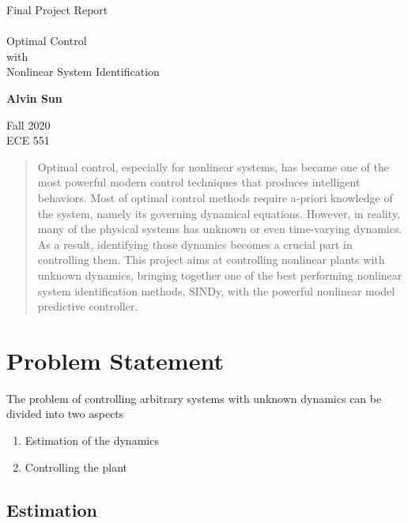 \documentclass[10pt,twocolumn]{article}
\begin{document}
\begin{titlepage}
  \begin{center}
    \Huge
    Final Project Report \\
    \hfill \\
    Optimal Control \\ with \\ Nonlinear System Identification

    \vfill

    \Large
    \textbf{Alvin Sun} \\

    \vfill

    Fall 2020 \\
    ECE 551

  \end{center}
\end{titlepage}

\begin{abstract}
  Optimal control, especially for nonlinear systems, has became one of the most powerful
  modern control techniques that produces intelligent behaviors. Most of optimal control
  methods require a-priori knowledge of the system, namely its governing dynamical equations.
  However, in reality, many of the physical systems has unknown or even time-varying dynamics.
  As a result, identifying those dynamics becomes a crucial part in controlling them.
  This project aims at controlling nonlinear plants with unknown dynamics, bringing together
  one of the best performing nonlinear system identification methods, SINDy, with the
  powerful nonlinear model predictive controller.
\end{abstract}

\section{Problem Statement}

The problem of controlling arbitrary systems with unknown dynamics can be divided into
two aspects
\begin{enumerate}
  \item Estimation of the dynamics
  \item Controlling the plant
\end{enumerate}

\subsection{Estimation}
\end{document}

